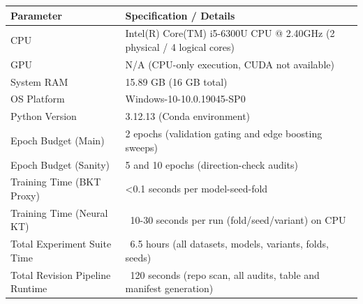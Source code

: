 \begin{tabular}{ll}
\hline
Parameter & Specification / Details \\
\hline
CPU & Intel(R) Core(TM) i5-6300U CPU @ 2.40GHz (2 physical / 4 logical cores) \\
GPU & N/A (CPU-only execution, CUDA not available) \\
System RAM & 15.89 GB (16 GB total) \\
OS Platform & Windows-10-10.0.19045-SP0 \\
Python Version & 3.12.13 (Conda environment) \\
Epoch Budget (Main) & 2 epochs (validation gating and edge boosting sweeps) \\
Epoch Budget (Sanity) & 5 and 10 epochs (direction-check audits) \\
Training Time (BKT Proxy) & <0.1 seconds per model-seed-fold \\
Training Time (Neural KT) & ~10-30 seconds per run (fold/seed/variant) on CPU \\
Total Experiment Suite Time & ~6.5 hours (all datasets, models, variants, folds, seeds) \\
Total Revision Pipeline Runtime & ~120 seconds (repo scan, all audits, table and manifest generation) \\
\hline
\end{tabular}